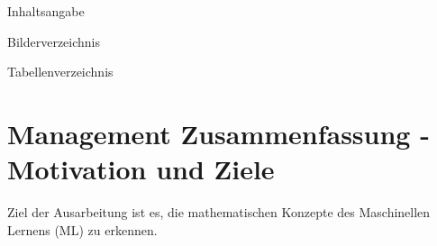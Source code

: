\documentclass[12pt]{article}
\begin{document}
\begin{titlepage}
  
\end{titlepage}

\begin{LARGE} Inhaltsangabe \end{LARGE}

\tableofcontents

\newpage

\begin{LARGE} Bilderverzeichnis \end{LARGE}

\listoffigures 

\newpage

\begin{LARGE} Tabellenverzeichnis \end{LARGE}

\listoftables 

\newpage

 
\renewcommand{\labelenumi}{(\alph{enumi})}
\renewcommand{\labelenumii}{\arabic{enumii}.}

\fancyfoot[C]{--- \thepage/\pageref{LastPage}\ ---}

\section{Management Zusammenfassung - Motivation und Ziele}

Ziel der Ausarbeitung ist es, die {\color{blue}mathematischen Konzepte des Maschinellen Lernens (ML)} zu erkennen.
\end{document}
